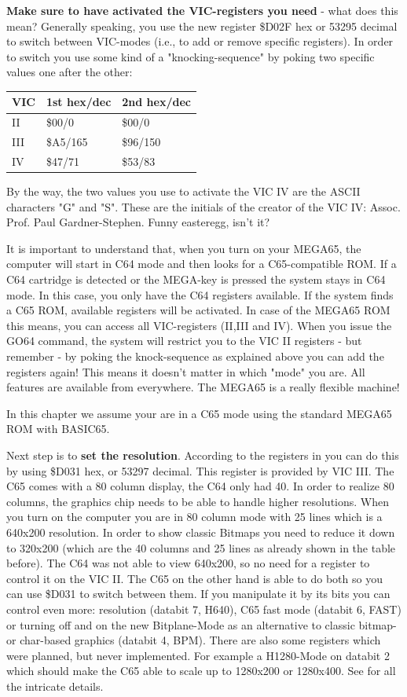 \textbf{Make sure to have activated the VIC-registers you need} - what does this mean? Generally speaking, you use the new register \$D02F hex or 53295 decimal to switch between VIC-modes (i.e., to add or remove specific registers). In order to switch you use some kind of a "knocking-sequence" by poking two specific values one after the other:

\begin{tabular}{|l|l|l|}
	\hline
	VIC & 1st hex/dec & 2nd hex/dec \\
	\hline
	II  & \$00/0 & \$00/0\\
	III & \$A5/165 & \$96/150\\
	IV  & \$47/71 & \$53/83\\
	\hline
\end{tabular}

By the way, the two values you use to activate the VIC IV are the ASCII characters "G" and "S". These are the initials of the creator of the VIC IV: Assoc. Prof. Paul Gardner-Stephen. Funny easteregg, isn't it?

It is important to understand that, when you turn on your MEGA65, the computer will start in C64 mode and then looks for a C65-compatible ROM. If a C64 cartridge is detected or the MEGA-key is pressed the system stays in C64 mode. In this case, you only have the C64 registers available. If the system finds a C65 ROM, available registers will be activated. In case of the MEGA65 ROM this means, you can access all VIC-registers (II,III and IV). When you issue the GO64 command, the system will restrict you to the VIC II registers - but remember - by poking the knock-sequence as explained above you can add the registers again! This means it doesn't matter in which "mode" you are. All features are available from everywhere. The MEGA65 is a really flexible machine!


In this chapter we assume your are in a C65 mode using the standard MEGA65 ROM with BASIC65.


Next step is to \textbf{set the resolution}. According to the registers in  you can do this by using \$D031 hex, or 53297 decimal. This register is provided by VIC III. The C65 comes with a 80 column display, the C64 only had 40. In order to realize 80 columns, the graphics chip needs to be able to handle higher resolutions. When you turn on the computer you are in 80 column mode with 25 lines which is a 640x200 resolution. In order to show classic Bitmaps you need to reduce it down to 320x200 (which are the 40 columns and 25 lines as already shown in the table before). The C64 was not able to view 640x200, so no need for a register to control it on the VIC II. The C65 on the other hand is able to do both so you can use \$D031 to switch between them.  If you manipulate it by its bits you can control even more: resolution (databit 7, H640), C65 fast mode (databit 6, FAST) or turning off and on the new Bitplane-Mode as an alternative to classic bitmap- or char-based graphics (databit 4, BPM). There are also some registers which were planned, but never implemented. For example a H1280-Mode on databit 2 which should make the C65 able to scale up to 1280x200 or 1280x400. See  for all the intricate details.


